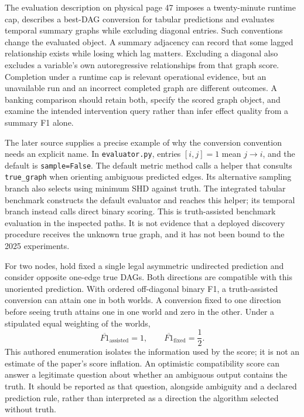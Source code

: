 The evaluation description on physical page 47 imposes a twenty-minute runtime
cap, describes a best-DAG conversion for tabular predictions and evaluates
temporal summary graphs while excluding diagonal entries. Such conventions
change the evaluated object. A summary adjacency can record that some lagged
relationship exists while losing which lag matters. Excluding a diagonal
also excludes a variable's own autoregressive relationships from that graph
score. Completion under a runtime cap is relevant operational evidence, but
an unavailable run and an incorrect completed graph are different outcomes.
A banking comparison should retain both, specify the scored graph object,
and examine the intended intervention query rather than infer effect quality
from a summary F1 alone.~\citep{exec17_copilot_paper}

The later source supplies a precise example of why the conversion convention
needs an explicit name. In \texttt{evaluator.py}, entries $[i,j]=1$ mean
$j\to i$, and the default is \texttt{sample=False}. The default metric method
calls a helper that consults \texttt{true\_graph} when orienting ambiguous
predicted edges. Its alternative sampling branch also selects using minimum
SHD against truth. The integrated tabular benchmark constructs the default
evaluator and reaches this helper; its temporal branch instead calls direct
binary scoring. This is truth-assisted benchmark evaluation in the inspected
paths. It is not evidence that a deployed discovery procedure receives the
unknown true graph, and it has not been bound to the 2025 experiments.
\citep{exec17_copilot_code}

For two nodes, hold fixed a single legal asymmetric undirected prediction and
consider opposite one-edge true DAGs. Both directions are compatible with this
unoriented prediction. With ordered off-diagonal binary F1, a truth-assisted
conversion can attain one in both worlds. A conversion fixed to one direction
before seeing truth attains one in one world and zero in the other. Under a
stipulated equal weighting of the worlds,
\begin{equation}
 \overline{F1}_{\mathrm{assisted}}=1,\qquad
 \overline{F1}_{\mathrm{fixed}}=\frac12.
 \label{exec17:copilot-score}
\end{equation}
This authored enumeration isolates the information used by the score; it is
not an estimate of the paper's score inflation. An optimistic compatibility
score can answer a legitimate question about whether an ambiguous output
contains the truth. It should be reported as that question, alongside ambiguity
and a declared prediction rule, rather than interpreted as a direction the
algorithm selected without truth.~\citep{exec17_copilot_exact}

